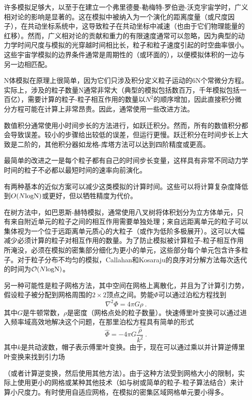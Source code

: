 许多模拟足够大，以至于在建立一个弗里德曼-勒梅特-罗伯逊-沃克宇宙学时，广义相对论的影响是显著的。这在模拟中被纳入为一个演化的距离度量（或尺度因子），在共动坐标系统中，这导致粒子在共动坐标中减速（也由于它们物理能量的红移）。然而，广义相对论的贡献和重力的有限速度通常可以忽略，因为典型的动力学时间尺度与模拟的光穿越时间相比长，粒子和粒子速度引起的时空曲率很小。这些宇宙学模拟的边界条件通常是周期性的（或环面的），以便模拟体积的一边与另一边相匹配。

N体模拟在原理上很简单，因为它们只涉及积分定义粒子运动的6N个常微分方程。实际上，涉及的粒子数量N通常非常大（典型的模拟包括数百万，千年模拟包括一百亿），需要计算的粒子-粒子相互作用的数量以$N^2$的顺序增加，因此直接积分微分方程可能在计算上非常昂贵。因此，通常使用一些改进方法。

数值积分通常使用小时间步长的方法进行，如跃迁积分。然而，所有的数值积分都会导致误差。较小的步骤给出较低的误差，但运行更慢。跃迁积分在时间步长上大致是二阶的，其他积分器如龙格-库塔方法可以达到四阶精度或更高。

最简单的改进之一是每个粒子都有自己的时间步长变量，这样具有非常不同动力学时间的粒子不必都以最短时间的速率向前演化。

有两种基本的近似方案可以减少这类模拟的计算时间。这些可以将计算复杂度降低到$O(N \rm{log} N)$或更好，但以牺牲精度为代价。

在树方法中，如巴恩斯-赫特模拟，通常使用八叉树将体积划分为立方体单元，只有来自附近单元的粒子之间的相互作用需要单独处理；来自远距离单元的粒子可以集体视为一个位于远距离单元质心的大粒子（或作为低阶多极展开）。这可以大幅减少必须计算的粒子对相互作用的数量。为了防止模拟被计算粒子-粒子相互作用所淹没，必须在模拟的密集部分细化为更小的单元，这些部分每个单元包含许多粒子。对于粒子分布不均匀的模拟，Callahan和Kosaraju的良序对分解方法每次迭代的时间为$\mathcal O(N \rm{log} N)$。

另一种可能性是粒子网格方法，其中空间在网格上离散化，并且为了计算引力势，假设粒子被分配到网格周围的$2\times 2$顶点之间。势能$\Phi$可以通过泊松方程找到
\begin{equation}
\nabla^2\Phi = 4\pi G\rho~.
\end{equation}
其中$G$是牛顿常数，$\rho$是密度（网格点处的粒子数量）。快速傅里叶变换可以通过进入频率域高效地解决这个问题，在那里泊松方程具有简单的形式
\begin{equation}
\hat \Phi = -4\pi G \frac{\hat\rho}{k^2}~.
\end{equation}
其中$k$是共动波数，帽子表示傅里叶变换。由于，现在可以通过乘以并计算逆傅里叶变换来找到引力场

（或者计算逆变换，然后使用其他方法）。由于这种方法受到网格大小的限制，实际上使用更小的网格或某种其他技术（如与树或简单的粒子-粒子算法结合）来计算小尺度力。有时使用自适应网格，在模拟的密集区域网格单元要小得多。

